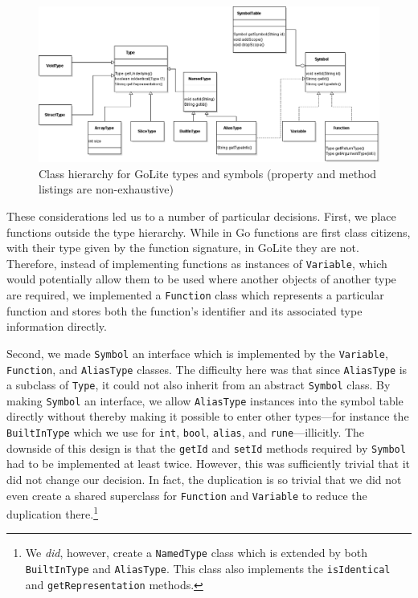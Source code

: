 \documentclass[oneside]{article}
\begin{document}
\begin{figure}
    \includegraphics[width=\textwidth]{symbol_table_uml}
    \caption{Class hierarchy for GoLite types and symbols (property and method listings are non-exhaustive)}
    \label{fig:symbol_table_uml}
\end{figure}

These considerations led us to a number of particular decisions. First, we place functions outside the type hierarchy. While in Go functions are first class citizens, with their type given by the function signature, in GoLite they are not. Therefore, instead of implementing functions as instances of \texttt{Variable}, which would potentially allow them to be used where another objects of another type are required, we implemented a \texttt{Function} class which represents a particular function and stores both the function's identifier and its associated type information directly.

Second, we made \texttt{Symbol} an interface which is implemented by the \texttt{Variable}, \texttt{Function}, and \texttt{AliasType} classes. The difficulty here was that since \texttt{AliasType} is a subclass of \texttt{Type}, it could not also inherit from an abstract \texttt{Symbol} class. By making \texttt{Symbol} an interface, we allow \texttt{AliasType} instances into the symbol table directly without thereby making it possible to enter other types---for instance the \texttt{BuiltInType} which we use for \texttt{int}, \texttt{bool}, \texttt{alias}, and \texttt{rune}---illicitly. The downside of this design is that the \texttt{getId} and \texttt{setId} methods required by \texttt{Symbol} had to be implemented at least twice. However, this was sufficiently trivial that it did not change our decision. In fact, the duplication is so trivial that we did not even create a shared superclass for \texttt{Function} and \texttt{Variable} to reduce the duplication there.\footnote{We \emph{did}, however, create a \texttt{NamedType} class which is extended by both \texttt{BuiltInType} and \texttt{AliasType}. This class also implements the \texttt{isIdentical} and \texttt{getRepresentation} methods.}
\end{document}
